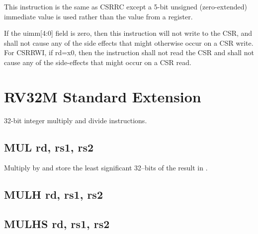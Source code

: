 This instruction is the same as CSRRC except a 5-bit unsigned (zero-extended)
immediate value is used rather than the value from a register.

If the uimm[4:0] field is zero, then this instruction will not
write to the CSR, and shall not cause any of the side effects that 
might otherwise occur on a CSR write. For CSRRWI, if rd=x0, then 
the instruction shall not read the CSR and shall not cause any
of the side-effects that might occur on a CSR 
read.~\cite[p.~22]{rvismv1v22:2017}


\section{RV32M Standard Extension}

32-bit integer multiply and divide instructions.

\subsection{MUL rd, rs1, rs2}

Multiply  by  and store the least significant 32--bits
of the result in .



\subsection{MULH rd, rs1, rs2}


\subsection{MULHS rd, rs1, rs2}


